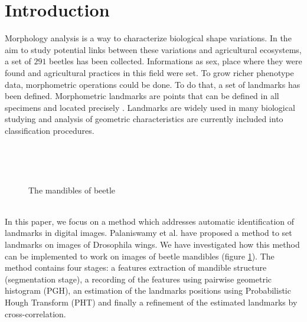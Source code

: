 \documentclass[twoside,twocolumn,10pt]{article}
\begin{document}


\section{Introduction}

\copyrightspace
Morphology analysis is a way to characterize biological shape
variations. In the aim to study potential links between these
variations and agricultural ecosystems, a set of $291$ beetles has been collected. Informations as
sex, place where they were found and agricultural practices in
this field were set. To grow richer phenotype data, morphometric
operations could be done. To do that, a set of landmarks has been
defined. Morphometric landmarks are points that can be defined in all specimens and
located precisely \cite{web2010}. Landmarks are widely used in many biological
studying and analysis of geometric characteristics are currently included
into classification procedures.

\\
\begin{figure}[h!]
\centering
{}~~
\caption{The mandibles of beetle}
\label{fig:figure_11}
\end{figure}
\\
In this paper, we focus on a method which addresses automatic identification of
landmarks in digital images. Palaniswamy et
al. \cite{palaniswamy2010automatic} have proposed a method to set landmarks
on images of Drosophila wings. We have investigated how this method can be
implemented to work on images of beetle mandibles (figure
\ref{fig:figure_11}). The method contains four stages: a features extraction of mandible
structure (segmentation stage), a recording of the features using pairwise
geometric histogram (PGH), an estimation of the landmarks positions using
Probabilistic Hough Transform (PHT) and finally a refinement of the estimated
landmarks by cross-correlation.
\end{document}
